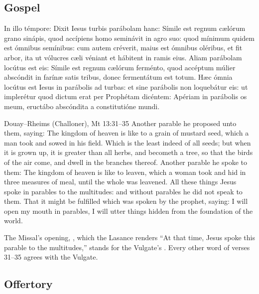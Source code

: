 \subsection{Gospel}
\label{proper-gospel}


\begin{latinproper}
In illo témpore: Dixit Iesus turbis parábolam hanc: Símile est regnum cælórum
grano sinápis, quod accípiens homo seminávit in agro suo: quod mínimum quidem
est ómnibus semínibus: cum autem créverit, maius est ómnibus oléribus, et fit
arbor, ita ut vólucres cæli véniant et hábitent in ramis eius. Aliam parábolam
locútus est eis: Símile est regnum cælórum ferménto, quod accéptum múlier
abscóndit in farínæ satis tribus, donec fermentátum est totum. Hæc ómnia
locútus est Iesus in parábolis ad turbas: et sine parábolis non loquebátur
eis: ut implerétur quod dictum erat per Prophétam dicéntem: Apériam in
parábolis os meum, eructábo abscóndita a constitutióne mundi.
\end{latinproper}

\begin{englishwitness}{Douay--Rheims (Challoner), Mt 13:31--35}
Another parable he proposed unto them, saying: The kingdom of heaven is like
to a grain of mustard seed, which a man took and sowed in his field. Which is
the least indeed of all seeds; but when it is grown up, it is greater than all
herbs, and becometh a tree, so that the birds of the air come, and dwell in the
branches thereof. Another parable he spoke to them: The kingdom of heaven is
like to leaven, which a woman took and hid in three measures of meal, until
the whole was leavened. All these things Jesus spoke in parables to the
multitudes: and without parables he did not speak to them. That it might be
fulfilled which was spoken by the prophet, saying: I will open my mouth in
parables, I will utter things hidden from the foundation of the world.
\end{englishwitness}

\noindent The Missal's opening, , which the Lasance renders ``At that time, Jesus spoke this
parable to the multitudes,'' stands for the Vulgate's . Every other word of verses 31--35 agrees with the
Vulgate.

\subsection{Offertory}
\label{proper-offertory}

